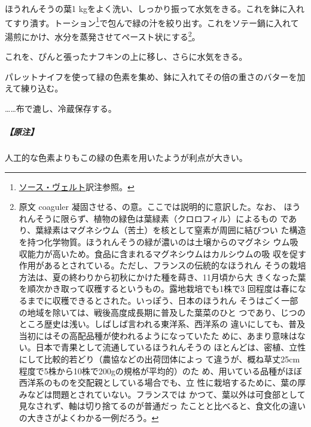 \begin{recette}

ほうれんそうの葉1
kgをよく洗い、しっかり振って水気をきる。これを鉢に入れてすり潰す。トーション\footnote{\protect\hyperlink{sauce-verte}{ソース・ヴェルト}訳注参照。}で包んで緑の汁を絞り出す。これをソテー鍋に入れて湯煎にかけ、水分を蒸発させてペースト状にする\footnote{原文
  coaguler 凝固させる、の意。ここでは説明的に意訳した。なお、
  ほうれんそうに限らず、植物の緑色は葉緑素（クロロフィル）によるもの
  であり、葉緑素はマグネシウム（苦土）を核として窒素が周囲に結びつい
  た構造を持つ化学物質。ほうれんそうの緑が濃いのは土壌からのマグネシ
  ウム吸収能力が高いため。食品に含まれるマグネシウムはカルシウムの吸
  収を促す作用があるとされている。ただし、フランスの伝統的なほうれん
  そうの栽培方法は、夏の終わりから初秋にかけた種を蒔き、11月頃から大
  きくなった葉を順次かき取って収穫するというもの。露地栽培でも1株で3
  回程度は春になるまでに収穫できるとされた。いっぽう、日本のほうれん
  そうはごく一部の地域を除いては、戦後高度成長期に普及した葉菜のひと
  つであり、じつのところ歴史は浅い。しばしば言われる東洋系、西洋系の
  違いにしても、普及当初にはその高配品種が使われるようになっていたた
  めに、あまり意味はない。日本で青果として流通しているほうれんそうの
  ほとんどは、密植、立性にして比較的若どり（農協などの出荷団体によっ
  て違うが、概ね草丈25cm程度で5株から10株で200gの規格が平均的）のた
  め、用いている品種がほぼ西洋系のものを交配親としている場合でも、立
  性に栽培するために、葉の厚みなどは問題とされていない。フランスでは
  かつて、葉以外は可食部として見なされず、軸は切り捨てるのが普通だっ
  たことと比べると、食文化の違いの大きさがよくわかる一例だろう。}。

これを、ぴんと張ったナフキンの上に移し、さらに水気をきる。

パレットナイフを使って緑の色素を集め、鉢に入れてその倍の重さのバターを加えて練り込む。

\ldots{}\ldots{}布で漉し、冷蔵保存する。

\hypertarget{ux539fux6ce8-1}{%
\subparagraph{【原注】}\label{ux539fux6ce8-1}}

人工的な色素よりもこの緑の色素を用いたようが利点が大きい。


\end{recette}
